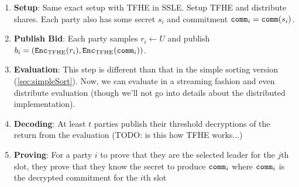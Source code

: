 \documentclass[11pt]{article}
\begin{document}
\begin{enumerate}
  \item \textbf{Setup}: Same exact setup with TFHE in SSLE. Setup TFHE and distribute shares.
  Each party also has some secret $s_i$ and commitment $\texttt{comm}_i = \texttt{comm}(s_i)$.
  \item \textbf{Publish Bid}: Each party samples $r_i \leftarrow U$ and publish $b_i = (\texttt{Enc}_{\mathrm{TFHE}}(r_i), \texttt{Enc}_{\mathrm{TFHE}}(\texttt{comm}_i))$.
  \item \textbf{Evaluation}: This step is different than that in the simple sorting version (\cref{sec:simpleSort}).
  Now, we can evaluate in a streaming fashion and even distribute evaluation (though we'll not go into details about the distributed implementation).

  \item \textbf{Decoding}: At least $t$ parties publish their threshold decryptions of the return from the evaluation (TODO: is this how TFHE works...)
  \item \textbf{Proving}: For a party $i$ to prove that they are the selected leader for the $j$th slot, they prove that they know the secret to produce $\texttt{comm}_i$
  where $\texttt{comm}_i$ is the decrypted commitment for the $i$th slot
\end{enumerate}



\end{document}
